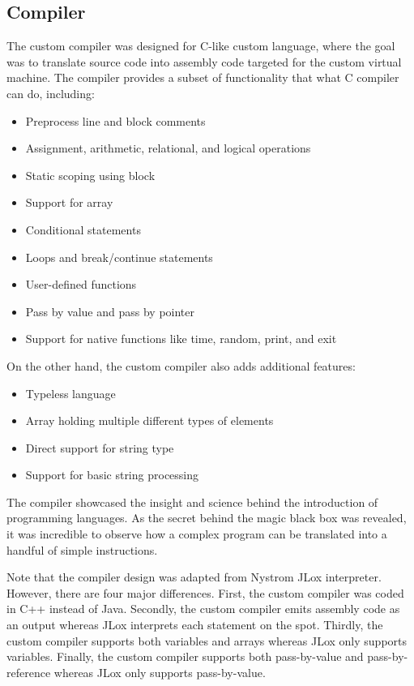 \documentclass[manuscript,screen,nonacm]{acmart}
\begin{document}
\subsection{Compiler}
The custom compiler was designed for C-like custom language, where the goal was to translate source code into assembly code targeted for the custom virtual machine. The compiler provides a subset of functionality that what C compiler can do, including:
\begin{itemize}
    \item Preprocess line and block comments
    \item Assignment, arithmetic, relational, and logical operations
    \item Static scoping using block
    \item Support for array
    \item Conditional statements
    \item Loops and break/continue statements
    \item User-defined functions 
    \item Pass by value and pass by pointer
    \item Support for native functions like time, random, print, and exit
\end{itemize}
On the other hand, the custom compiler also adds additional features:
\begin{itemize}
    \item Typeless language
    \item Array holding multiple different types of elements
    \item Direct support for string type
    \item Support for basic string processing
\end{itemize}
The compiler showcased the insight and science behind the introduction of programming languages. As the secret behind the magic black box was revealed, it was incredible to observe how a complex program can be translated into a handful of simple instructions.

Note that the compiler design was adapted from Nystrom JLox interpreter\cite{Nystrom}. However, there are four major differences. First, the custom compiler was coded in C++ instead of Java. Secondly, the custom compiler emits assembly code as an output whereas JLox interprets each statement on the spot. Thirdly, the custom compiler supports both variables and arrays whereas JLox only supports variables. Finally, the custom compiler supports both pass-by-value and pass-by-reference whereas JLox only supports pass-by-value.
\end{document}
